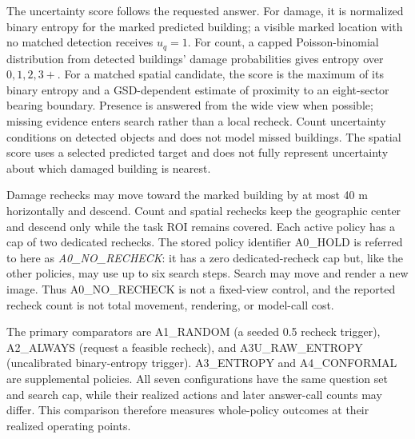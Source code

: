 The uncertainty score follows the requested answer. For damage, it is normalized binary entropy for the marked predicted building; a visible marked location with no matched detection receives $u_q=1$. For count, a capped Poisson-binomial distribution from detected buildings' damage probabilities gives entropy over $0,1,2,3+$. For a matched spatial candidate, the score is the maximum of its binary entropy and a GSD-dependent estimate of proximity to an eight-sector bearing boundary. Presence is answered from the wide view when possible; missing evidence enters search rather than a local recheck. Count uncertainty conditions on detected objects and does not model missed buildings. The spatial score uses a selected predicted target and does not fully represent uncertainty about which damaged building is nearest.

Damage rechecks may move toward the marked building by at most 40 m horizontally and descend. Count and spatial rechecks keep the geographic center and descend only while the task ROI remains covered. Each active policy has a cap of two dedicated rechecks. The stored policy identifier A0\_HOLD is referred to here as \emph{A0\_NO\_RECHECK}: it has a zero dedicated-recheck cap but, like the other policies, may use up to six search steps. Search may move and render a new image. Thus A0\_NO\_RECHECK is not a fixed-view control, and the reported recheck count is not total movement, rendering, or model-call cost.

The primary comparators are A1\_RANDOM (a seeded 0.5 recheck trigger), A2\_ALWAYS (request a feasible recheck), and A3U\_RAW\_ENTROPY (uncalibrated binary-entropy trigger). A3\_ENTROPY and A4\_CONFORMAL are supplemental policies. All seven configurations have the same question set and search cap, while their realized actions and later answer-call counts may differ. This comparison therefore measures whole-policy outcomes at their realized operating points.

